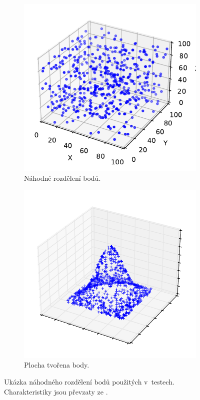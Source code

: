 \begin{figure}
\begin{subfigure}[t]{0.49\columnwidth}
\centering
    \includegraphics[scale=0.5]{obrazky-figures/testing/randompoints.pdf}
    \caption{Náhodné rozdělení bodů.}
\end{subfigure}
\hfill
\begin{subfigure}[t]{0.49\columnwidth}
\centering
    \includegraphics[scale=0.45]{obrazky-figures/knn_norm/points_3d normal_plane_1000.pdf}
    \caption{Plocha tvořena body.}
\end{subfigure}


\caption{Ukázka náhodného rozdělení bodů použitých v~testech. Charakteristiky jsou převzaty ze \cite{octreehash}.}
\end{figure}



